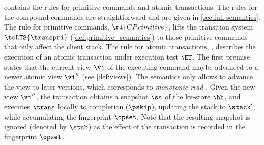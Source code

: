  contains the rules for primitive commands and atomic transactions.  
The rules for the compound commands are straightforward and are given in \cref{sec:full-semantics}.
The rule for primitive commands, $\rl{CPrimitive}$, lifts the transition system 
$\toLTS{\transpri}$ (\cref{def:primitive_semantics}) to those primitive commands that only affect the client stack. 
The rule for atomic transactions, , describes the execution of an atomic 
transaction under execution test $\ET$.  
The first premise
states that the current view $\vi$ of the executing command maybe advanced to a newer atomic view $\vi''$ (see \cref{def:views}). 
The semantics only allows to advance the view to later versions, which corresponds to \emph{monotonic read} \cite{.......}.
Given the new view $\vi''$, the transaction obtains a snapshot $\ss$ of the kv-store $\hh$, 
and executes $\trans$ locally to completion ($\pskip$), updating the stack to $\stack'$, while accumulating the fingerprint $\opset$. 
Note that the resulting snapshot is ignored (denoted by $\stub$) as the effect of the transaction is recorded in the fingerprint $\opset$. 
%

